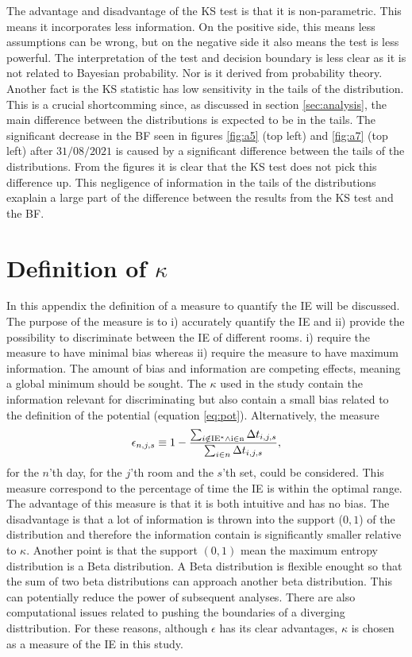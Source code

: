 \documentclass[fleqn,usenatbib,nofootinbib]{revtex4-2}
\begin{document}
\begin{appendices}
		The advantage and disadvantage of the KS test is that it is non-parametric. This means it incorporates less information. On the positive side, this means less assumptions can be wrong, but on the negative side it also means the test is less powerful. The interpretation of the test and decision boundary is less clear as it is not related to Bayesian probability. Nor is it derived from probability theory. Another fact is the KS statistic has low sensitivity in the tails of the distribution. This is a crucial shortcomming since, as discussed in section \ref{sec:analysis}, the main difference between the distributions is expected to be in the tails. The significant decrease in the BF seen in figures \ref{fig:a5} (top left) and \ref{fig:a7} (top left) after $31/08/2021$ is caused by a significant difference between the tails of the distributions. From the figures it is clear that the KS test does not pick this difference up. This negligence of information in the tails of the distributions exaplain a large part of the difference between the results from the KS test and the BF. 
		
		\section{Definition of $\kappa$}
		\label{app:discuss}
		In this appendix the definition of a measure to quantify the IE will be discussed. The purpose of the measure is to i) accurately quantify the IE and ii) provide the possibility to discriminate between the IE of different rooms.  i) require the measure to have minimal bias whereas ii) require the measure to have maximum information. The amount of bias and information are competing effects, meaning a global minimum should be sought. The $\kappa$ used in the study contain the information relevant for discriminating but also contain a small bias related to the definition of the potential (equation \eqref{eq:pot}). Alternatively, the measure 
		\begin{equation}
			\epsilon_{n,j,s} \equiv 1-\frac{\sum_{i\notin \rm IE^*\wedge i\in n}\Delta t_{i,j,s}}{\sum_{i\in n}\Delta t_{i,j,s}},
			\label{eq:g1}
		\end{equation}
		for the $n$'th day, for the $j$'th room and the $s$'th set, could be considered. This measure correspond to the percentage of time the IE is within the optimal range. The advantage of this measure is that it is both intuitive and has no bias. The disadvantage is that a lot of information is thrown into the support ($0,1$) of the distribution and therefore the information contain is significantly smaller relative to $\kappa$. Another point is that the support $(0,1)$ mean the maximum entropy distribution is a Beta distribution. A Beta distribution is flexible enought so that the sum of two beta distributions can approach another beta distribution. This can potentially reduce the power of subsequent analyses. There are also computational issues related to pushing the boundaries of a diverging disttribution. For these reasons, although $\epsilon$ has its clear advantages, $\kappa$ is chosen as a measure of the IE in this study. 
		

\end{appendices}
\end{document}
